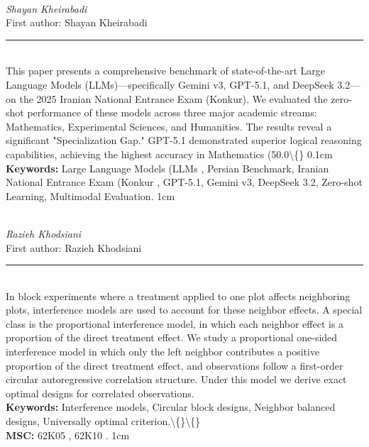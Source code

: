 \documentclass[10pt,twoside]{article}
\begin{document}
\noindent\begin{minipage}[t][\textheight]{\textwidth}
\\[0.35em]
{\itshape Shayan Kheirabadi}\\[0.2em]
{\footnotesize First author: Shayan Kheirabadi}\\[0.45em]
\noindent\rule{\textwidth}{0.3pt}\\[0.4em]
{\footnotesize  This paper presents a comprehensive benchmark of state-of-the-art Large Language Models (LLMs)---specifically Gemini v3, GPT-5.1, and DeepSeek 3.2---on the 2025 Iranian National Entrance Exam (Konkur). We evaluated the zero-shot performance of these models across three major academic streams: Mathematics, Experimental Sciences, and Humanities. The results reveal a significant "Specialization Gap." GPT-5.1 demonstrated superior logical reasoning capabilities, achieving the highest accuracy in Mathematics (50.0\textbackslash\{\} 0.1cm}\\[0.4em]
{\footnotesize\bfseries Keywords:} {\footnotesize Large Language Models (LLMs , Persian Benchmark, Iranian National Entrance Exam (Konkur , GPT-5.1, Gemini v3, DeepSeek 3.2, Zero-shot Learning, Multimodal Evaluation. 1cm}\\[0.15em]
\vfill
\end{minipage}
\newpage

\noindent\begin{minipage}[t][\textheight]{\textwidth}
\\[0.35em]
{\itshape Razieh Khodsiani}\\[0.2em]
{\footnotesize First author: Razieh Khodsiani}\\[0.45em]
\noindent\rule{\textwidth}{0.3pt}\\[0.4em]
{\footnotesize  In block experiments where a treatment applied to one plot affects neighboring plots, interference models are used to account for these neighbor effects. A special class is the proportional interference model, in which each neighbor effect is a proportion of the direct treatment effect. We study a proportional one-sided interference model in which only the left neighbor contributes a positive proportion of the direct treatment effect, and observations follow a first-order circular autoregressive correlation structure. Under this model we derive exact optimal designs for correlated observations.}\\[0.4em]
{\footnotesize\bfseries Keywords:} {\footnotesize Interference models, Circular block designs, Neighbor balanced designs, Universally optimal criterion.\textbackslash\{\}\textbackslash\{\}}\\[0.15em]
{\footnotesize\bfseries MSC:} {\footnotesize 62K05 , 62K10 . 1cm}\\
\vfill
\end{minipage}
\newpage
\end{document}
